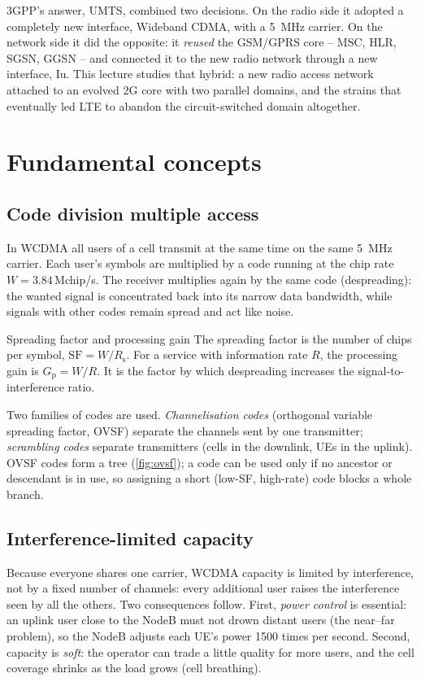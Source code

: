 \documentclass[11pt,a4paper]{article}
\begin{document}
3GPP's answer, UMTS, combined two decisions. On the radio side it adopted a completely new
interface, Wideband CDMA, with a \qty{5}{\mega\hertz} carrier. On the network side it did the
opposite: it \emph{reused} the GSM/GPRS core -- MSC, HLR, SGSN, GGSN -- and connected it to the
new radio network through a new interface, Iu. This lecture studies that hybrid: a new radio
access network attached to an evolved 2G core with two parallel domains, and the strains
that eventually led LTE to abandon the circuit-switched domain altogether.

\section{Fundamental concepts}

\subsection{Code division multiple access}
In WCDMA all users of a cell transmit at the same time on the same \qty{5}{\mega\hertz} carrier.
Each user's symbols are multiplied by a code running at the chip rate
$W = 3.84$\,Mchip/s. The receiver multiplies again by the same code (despreading): the wanted
signal is concentrated back into its narrow data bandwidth, while signals with other codes
remain spread and act like noise.

\begin{definitionbox}{Spreading factor and processing gain}
The spreading factor is the number of chips per symbol, $\mathrm{SF} = W/R_{\mathrm{s}}$. For a
service with information rate $R$, the processing gain is $G_{\mathrm{p}} = W/R$. It is the
factor by which despreading increases the signal-to-interference ratio.
\end{definitionbox}

Two families of codes are used. \emph{Channelisation codes} (orthogonal variable spreading
factor, OVSF) separate the channels sent by one transmitter; \emph{scrambling codes} separate
transmitters (cells in the downlink, UEs in the uplink). OVSF codes form a tree
(\cref{fig:ovsf}); a code can be used only if no ancestor or descendant is in use, so assigning
a short (low-SF, high-rate) code blocks a whole branch.

\subsection{Interference-limited capacity}
Because everyone shares one carrier, WCDMA capacity is limited by interference, not by a fixed
number of channels: every additional user raises the interference seen by all the others. Two
consequences follow. First, \emph{power control} is essential: an uplink user close to the
NodeB must not drown distant users (the near--far problem), so the NodeB adjusts each UE's power
1500 times per second. Second, capacity is \emph{soft}: the operator can trade a little quality
for more users, and the cell coverage shrinks as the load grows (cell breathing).
\end{document}
